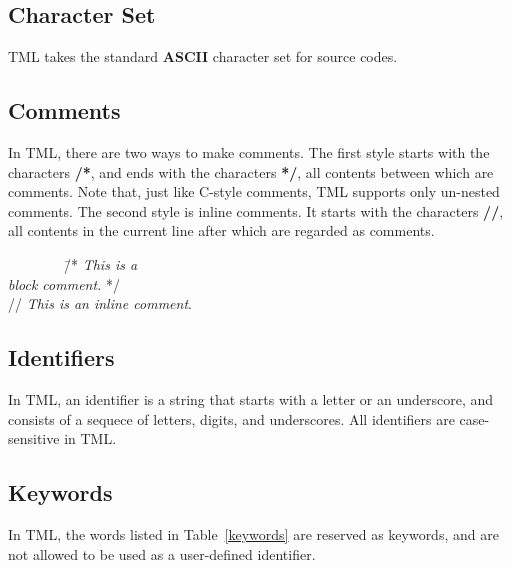 \documentclass[12pt,psfig,a4]{article}
\begin{document}

\subsection{Character Set}
TML takes the standard \textbf{ASCII} character set for source codes.

\subsection{Comments}
In TML, there are two ways to make comments. The first style starts with the characters \textbf{/*}, and ends with the characters \textbf{*/}, all contents between which are comments. Note that, just like C-style comments, TML supports only un-nested comments. The second style is inline comments. It starts with the characters \textbf{//}, all contents in the current line after which are regarded as comments.

\begin{code}
\begin{tabbing}
~~~~~~~~\= /*  \=\textit{This is a} \\
\> \> \textit{block comment.} */\\
\> // \textit{This is an inline comment}.
\end{tabbing}
\end{code}

\subsection{Identifiers} \label{lexConId}
In TML, an identifier is a string that starts with a letter or an underscore, and consists of a sequece of letters, digits, and underscores. %
All identifiers are case-sensitive in TML.

\subsection{Keywords}
In TML, the words listed in Table~\ref{keywords} are reserved as keywords, and are not allowed to be used as a user-defined identifier.
\end{document}
